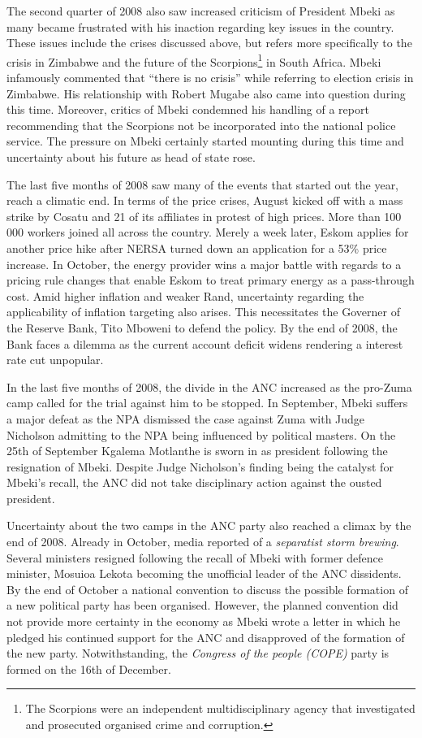 \documentclass[11pt,preprint, authoryear]{elsarticle}
\numberwithin{equation}{section}
\numberwithin{figure}{section}
\numberwithin{table}{section}
\let\rmarkdownfootnote\footnote%
\def\footnote{\protect\rmarkdownfootnote}
\begin{document}
The second quarter of 2008 also saw increased criticism of President
Mbeki as many became frustrated with his inaction regarding key issues
in the country. These issues include the crises discussed above, but
refers more specifically to the crisis in Zimbabwe and the future of the
Scorpions\footnote{The Scorpions were an independent multidisciplinary agency that investigated and prosecuted organised crime and corruption.} in South Africa. Mbeki infamously commented that ``there is no
crisis'' while referring to election crisis in Zimbabwe. His
relationship with Robert Mugabe also came into question during this
time. Moreover, critics of Mbeki condemned his handling of a report
recommending that the Scorpions not be incorporated into the national
police service. The pressure on Mbeki certainly started mounting during
this time and uncertainty about his future as head of state rose.

The last five months of 2008 saw many of the events that started out the
year, reach a climatic end. In terms of the price crises, August kicked
off with a mass strike by Cosatu and 21 of its affiliates in protest of
high prices. More than 100 000 workers joined all across the country.
Merely a week later, Eskom applies for another price hike after NERSA
turned down an application for a 53\% price increase. In October, the
energy provider wins a major battle with regards to a pricing rule
changes that enable Eskom to treat primary energy as a pass-through
cost. Amid higher inflation and weaker Rand, uncertainty regarding the
applicability of inflation targeting also arises. This necessitates the
Governer of the Reserve Bank, Tito Mboweni to defend the policy. By the
end of 2008, the Bank faces a dilemma as the current account deficit
widens rendering a interest rate cut unpopular.

In the last five months of 2008, the divide in the ANC increased as the
pro-Zuma camp called for the trial against him to be stopped. In
September, Mbeki suffers a major defeat as the NPA dismissed the case
against Zuma with Judge Nicholson admitting to the NPA being influenced
by political masters. On the 25th of September Kgalema Motlanthe is
sworn in as president following the resignation of Mbeki. Despite Judge
Nicholson's finding being the catalyst for Mbeki's recall, the ANC did
not take disciplinary action against the ousted president.

Uncertainty about the two camps in the ANC party also reached a climax
by the end of 2008. Already in October, media reported of a
\emph{separatist storm brewing}. Several ministers resigned following
the recall of Mbeki with former defence minister, Mosuioa Lekota
becoming the unofficial leader of the ANC dissidents. By the end of
October a national convention to discuss the possible formation of a new
political party has been organised. However, the planned convention did
not provide more certainty in the economy as Mbeki wrote a letter in
which he pledged his continued support for the ANC and disapproved of
the formation of the new party. Notwithstanding, the
\emph{Congress of the people (COPE)} party is formed on the 16th of
December.
\end{document}
